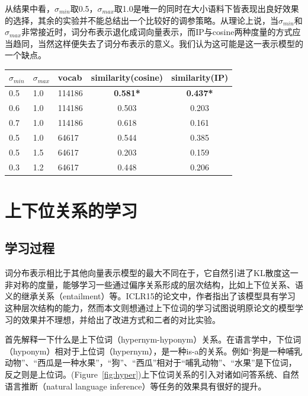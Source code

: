 \documentclass[a4paper,13pt]{article}
\begin{document}
\begin{spacing}{1.5}
从结果中看，$\sigma_{min}$取0.5，$\sigma_{max}$取1.0是唯一的同时在大小语料下皆表现出良好效果的选择，其余的实验并不能总结出一个比较好的调参策略。从理论上说，当$\sigma_{min}$和$\sigma_{max}$非常接近时，词分布表示退化成词向量表示，而IP与cosine两种度量的方式应当趋同，当然这样便失去了词分布表示的意义。我们认为这可能是这一表示模型的一个缺点。
\newpage
\begin{center}
\begin{tabular}{| l | l | l | c | c |}
\hline
\bf $\sigma_{min}$ & \bf $\sigma_{max}$ & \bf vocab & \bf similarity(cosine) & \bf similarity(IP) \\
\hline
0.5 & 1.0 & 114186 & \bf 0.581* & \bf 0.437* \\
\hline
0.6 & 1.0 & 114186 & 0.503 & 0.203\\
\hline  
0.7 & 1.0 & 114186 & 0.618 & 0.161 \\
\hline
0.5 & 1.0 & 64617 & 0.544 & 0.385 \\
\hline
0.5 & 1.5 & 64617 & 0.203 & 0.159 \\
\hline
0.3 & 1.2 & 64617 & 0.448 & 0.206 \\
\hline
\end{tabular}
\label{tab:sigma}
\end{center}

\section{上下位关系的学习}

\subsection{学习过程}

词分布表示相比于其他向量表示模型的最大不同在于，它自然引进了KL散度这一非对称的度量，能够学习一些通过偏序关系形成的层次结构，比如上下位关系、语义的继承关系（entailment）等。ICLR15的论文中，作者指出了该模型具有学习这种层次结构的能力，然而本文则想通过上下位词的学习试图说明原论文的模型学习的效果并不理想，并给出了改进方式和二者的对比实验。

首先解释一下什么是上下位词（hypernym-hyponym）关系。在语言学中，下位词（hyponym）相对于上位词（hypernym），是一种is-a的关系。例如“狗是一种哺乳动物”、“西瓜是一种水果”，“狗”、“西瓜”相对于“哺乳动物”、“水果”是下位词，反之则是上位词。(Figure\ \ref{fig:hyper})上下位词关系的引入对诸如问答系统、自然语言推断（natural language inference）等任务的效果具有很好的提升。


\end{spacing}
\end{document}
